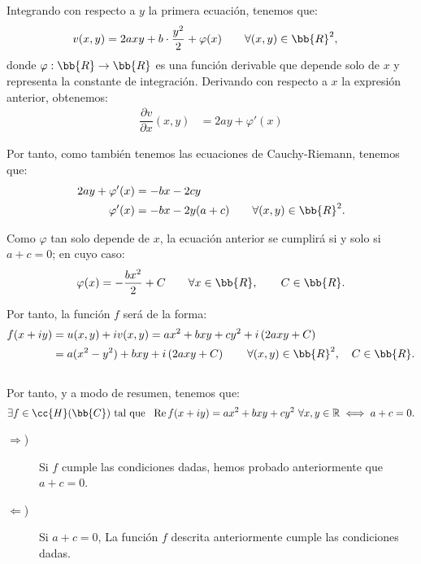 \begin{ejercicio}
    Integrando con respecto a $y$ la primera ecuación, tenemos que:
    \begin{align*}
        v(x,y) &= 2ax y + b\cdot \dfrac{y^2}{2} + \varphi(x)\qquad \forall (x,y)\in\bb{R}^2,
    \end{align*}
    donde $\varphi:\bb{R}\to\bb{R}$ es una función derivable que depende solo de $x$ y representa la constante de integración. Derivando con respecto a $x$ la expresión anterior, obtenemos:
    \begin{align*}
        \dfrac{\partial v}{\partial x}(x,y) &= 2ay + \varphi'(x)
    \end{align*}

    Por tanto, como también tenemos las ecuaciones de Cauchy-Riemann, tenemos que:
    \begin{align*}
        2ay + \varphi'(x) &= -bx - 2cy\\
        \varphi'(x) &= -bx - 2y(a+c)\qquad \forall (x,y)\in\bb{R}^2.
    \end{align*}

    Como $\varphi$ tan solo depende de $x$, la ecuación anterior se cumplirá si y solo si $a+c=0$; en cuyo caso:
    \[
        \varphi(x) = -\dfrac{bx^2}{2} + C\qquad \forall x\in\bb{R},\qquad C\in\bb{R}.
    \]

    Por tanto, la función $f$ será de la forma:
    \begin{align*}
        f(x+iy) &= u(x,y) + iv(x,y) = ax^2 + bxy + cy^2 + i\left(2axy + C\right)\\
        &= a(x^2-y^2) + bxy + i\left(2axy + C\right)\qquad \forall (x,y)\in\bb{R}^2,\quad C\in\bb{R}.
    \end{align*}~\\

    Por tanto, y a modo de resumen, tenemos que:
    \[
        \exists f \in \cc{H}(\bb{C}) \ \text{tal que }\ \Re f(x + iy) = ax^2 + bxy + cy^2 \ \forall x, y \in \mathbb{R} \iff a+c=0.
    \]
    \begin{description}
        \item[$\Rightarrow$)] Si $f$ cumple las condiciones dadas, hemos probado anteriormente que $a+c=0$.
        \item[$\Leftarrow$)] Si $a+c=0$, La función $f$ descrita anteriormente cumple las condiciones dadas.
    \end{description}

\end{ejercicio}


